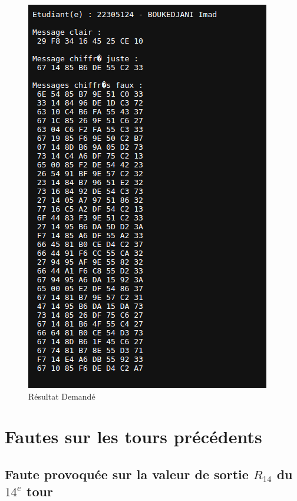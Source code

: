 \documentclass[12pt,a4paper]{report}
\begin{document}
\begin{figure}[h]
\begin{minipage}{0.4\textwidth}
        \includegraphics[width=\linewidth]{images/resultat_final2.png}
        \caption{Résultat Demandé}
        \label{fig:resultat2}
    \end{minipage}
\end{figure}
\newline

\section{Fautes sur les tours précédents}

\subsection{Faute provoquée sur la valeur de sortie $R_{14}$ du $14^{e}$ tour}
\end{document}
